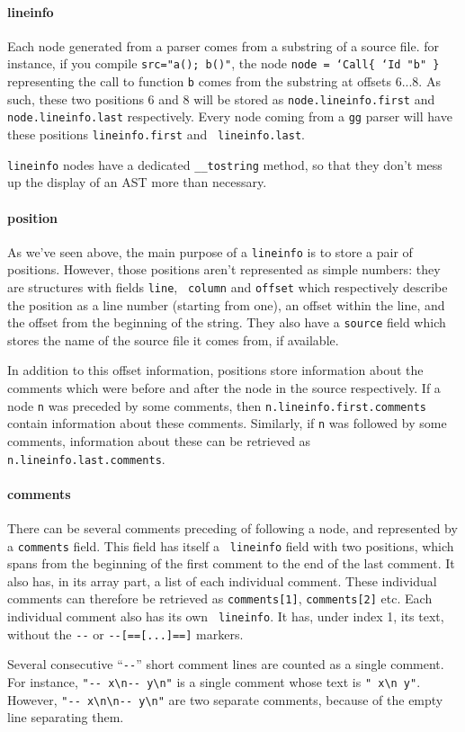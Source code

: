 \paragraph{lineinfo}
Each node generated from a parser comes from a substring of a source
file. for instance, if you compile {\tt src="a(); b()"}, the node
{\tt node = `Call\{ `Id "b" \}} representing the call to function {\tt b}
comes from the substring at offsets 6...8. As such, these two
positions 6 and 8 will be stored as {\tt node.lineinfo.first} and {\tt
  node.lineinfo.last} respectively. Every node coming from a {\tt gg}
parser will have these positions {\tt lineinfo.first} and {\tt
  lineinfo.last}.

{\tt lineinfo} nodes have a dedicated \verb|__tostring| method, so
that they don't mess up the display of an AST more than necessary.

\paragraph{position}
As we've seen above, the main purpose of a {\tt lineinfo} is to store
a pair of positions. However, those positions aren't represented as
simple numbers: they are structures with fields {\tt line}, {\tt
column} and {\tt offset} which respectively describe the position as a
line number (starting from one), an offset within the line, and the
offset from the beginning of the string. They also have a {\tt source}
field which stores the name of the source file it comes from, if
available.

In addition to this offset information, positions store information
about the comments which were before and after the node in the source
respectively. If a node {\tt n} was preceded by some comments, then
{\tt n.lineinfo.first.comments} contain information about these
comments. Similarly, if {\tt n} was followed by some comments,
information about these can be retrieved as\\
{\tt n.lineinfo.last.comments}. 

\paragraph{comments}
There can be several comments preceding of following a node, and
represented by a {\tt comments} field. This field has itself a {\tt
lineinfo} field with two positions, which spans from the beginning of
the first comment to the end of the last comment. It also has, in its
array part, a list of each individual comment. These individual
comments can therefore be retrieved as \verb|comments[1]|,
\verb|comments[2]| etc. Each individual comment also has its own {\tt
  lineinfo}. It has, under index 1, its text, without the \verb|--| or
\verb|--[==[...]==]| markers.

Several consecutive ``\verb|--|'' short comment lines are counted as a
single comment. For instance, \verb|"-- x\n-- y\n"| is a single
comment whose text is \verb|" x\n y"|. However,
\verb|"-- x\n\n-- y\n"| are two separate comments, because of the
empty line separating them.




